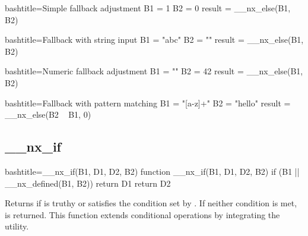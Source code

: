 \begin{NexCodeBox}{bash}{title={Simple fallback adjustment}}
	B1 = 1
	B2 = 0
	result = __nx_else(B1, B2)
\end{NexCodeBox}

\begin{NexCodeBox}{bash}{title={Fallback with string input}}
	B1 = "abc"
	B2 = ""
	result = __nx_else(B1, B2)
\end{NexCodeBox}

\begin{NexCodeBox}{bash}{title={Numeric fallback adjustment}}
	B1 = ""
	B2 = 42
	result = __nx_else(B1, B2)
\end{NexCodeBox}

\begin{NexCodeBox}{bash}{title={Fallback with pattern matching}}
	B1 = "[a-z]+"
	B2 = "hello"
	result = __nx_else(B2 ~ B1, 0)
\end{NexCodeBox}

\newpage
\subsection{__nx_if}
\label{__nx_if}
\begin{NexCodeBox}{bash}{title={__nx_if(B1, D1, D2, B2)}}
function __nx_if(B1, D1, D2, B2) {
	if (B1 || __nx_defined(B1, B2))
		return D1
	return D2
}
\end{NexCodeBox}

\begin{NexMainBox}
	\begin{NexMainBox}
		Returns  if  is truthy or satisfies the condition set by . If neither condition is met,  is returned. This function extends conditional operations by integrating the  utility.
	\end{NexMainBox}
	\begin{NexMainBox}
		\begin{NexListDark}
		\end{NexListDark}
	\end{NexMainBox}
\end{NexMainBox}

